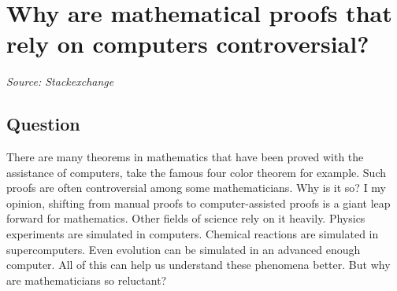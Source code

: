 \documentclass{article}
\begin{document}
\newpage

\section{Why are mathematical proofs that rely on computers controversial?}
\textit{Source: Stackexchange}

\subsection*{Question}
There are many theorems in mathematics that have been proved with the assistance of computers, take the famous four color theorem for example. Such proofs are often controversial among some mathematicians. Why is it so? I my opinion, shifting from manual proofs to computer-assisted proofs is a giant leap forward for mathematics. Other fields of science rely on it heavily. Physics experiments are simulated in computers. Chemical reactions are simulated in supercomputers. Even evolution can be simulated in an advanced enough computer. All of this can help us understand these phenomena better. But why are mathematicians so reluctant?
\end{document}
